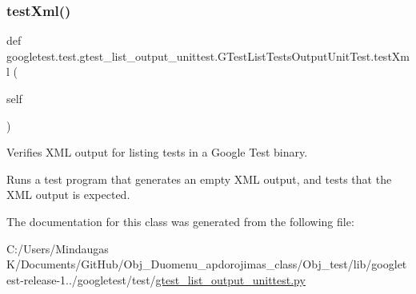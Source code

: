 \subsubsection{\texorpdfstring{testXml()}{testXml()}}
{\footnotesize\ttfamily def googletest.\+test.\+gtest\+\_\+list\+\_\+output\+\_\+unittest.\+G\+Test\+List\+Tests\+Output\+Unit\+Test.\+test\+Xml (\begin{DoxyParamCaption}\item[{}]{self }\end{DoxyParamCaption})}

\begin{DoxyVerb}Verifies XML output for listing tests in a Google Test binary.

Runs a test program that generates an empty XML output, and
tests that the XML output is expected.
\end{DoxyVerb}
 

The documentation for this class was generated from the following file\+:\begin{DoxyCompactItemize}
\item 
C\+:/\+Users/\+Mindaugas K/\+Documents/\+Git\+Hub/\+Obj\+\_\+\+Duomenu\+\_\+apdorojimas\+\_\+class/\+Obj\+\_\+test/lib/googletest-\/release-\/1../googletest/test/\mbox{\hyperlink{_obj__test_2lib_2googletest-release-1_88_81_2googletest_2test_2gtest__list__output__unittest_8py}{gtest\+\_\+list\+\_\+output\+\_\+unittest.\+py}}\end{DoxyCompactItemize}
